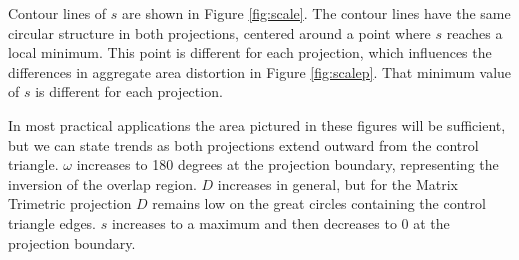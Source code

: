 \documentclass[]{interact}
\begin{document}
Contour lines of $s$ are shown in Figure \ref{fig:scale}.
The contour lines have the same circular structure in both projections,
centered around a point where $s$ reaches a local minimum.
This point is different for each projection, which influences
the differences in aggregate area distortion in Figure \ref{fig:scalep}.
That minimum value of $s$ is different for each projection.

In most practical applications the area pictured in these figures will be
sufficient, but we can state trends as both projections
extend outward from the control triangle. $\omega$ increases to 180 degrees at
the projection boundary, representing the inversion of the overlap region. $D$
increases in general, but for the Matrix Trimetric projection
$D$ remains low on the great circles containing the control triangle edges.
$s$ increases to a maximum and then decreases to 0 at the projection boundary.

%
%
%
%
\end{document}
